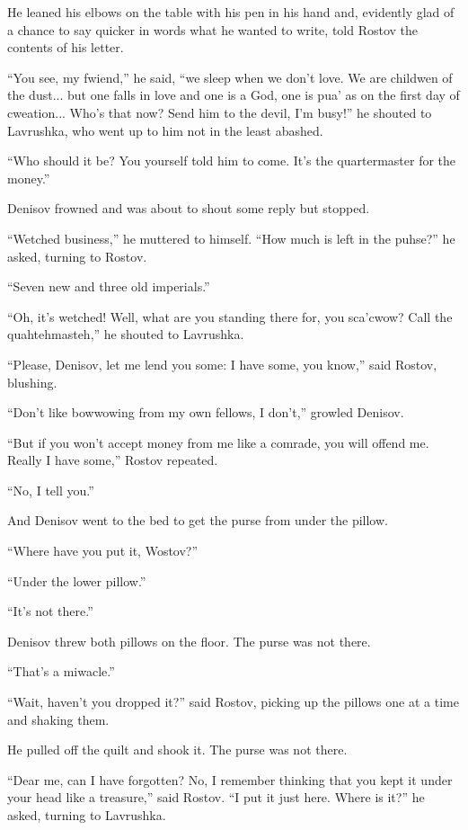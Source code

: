 He leaned his elbows on the table with his pen in his hand and,
evidently glad of a chance to say quicker in words what he wanted
to write, told Rostov the contents of his letter.

``You see, my fwiend,'' he said, ``we sleep when we don't
love. We are childwen of the dust... but one falls in love and
one is a God, one is pua' as on the first day of
cweation... Who's that now? Send him to the devil, I'm busy!'' he
shouted to Lavrushka, who went up to him not in the least
abashed.

``Who should it be? You yourself told him to come. It's the
quartermaster for the money.''

Denisov frowned and was about to shout some reply but stopped.

``Wetched business,'' he muttered to himself. ``How much is left
in the puhse?'' he asked, turning to Rostov.

``Seven new and three old imperials.''

``Oh, it's wetched! Well, what are you standing there for, you
sca'cwow?  Call the quahtehmasteh,'' he shouted to Lavrushka.

``Please, Denisov, let me lend you some: I have some, you know,''
said Rostov, blushing.

``Don't like bowwowing from my own fellows, I don't,'' growled
Denisov.

``But if you won't accept money from me like a comrade, you will
offend me. Really I have some,'' Rostov repeated.

``No, I tell you.''

And Denisov went to the bed to get the purse from under the
pillow.

``Where have you put it, Wostov?''

``Under the lower pillow.''

``It's not there.''

Denisov threw both pillows on the floor. The purse was not there.

``That's a miwacle.''

``Wait, haven't you dropped it?'' said Rostov, picking up the
pillows one at a time and shaking them.

He pulled off the quilt and shook it. The purse was not there.

``Dear me, can I have forgotten? No, I remember thinking that you
kept it under your head like a treasure,'' said Rostov. ``I put
it just here.  Where is it?'' he asked, turning to Lavrushka.

